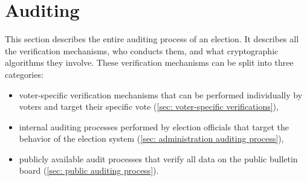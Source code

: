 \section{Auditing} \label{sec: auditing}
This section describes the entire auditing process of an election. It describes all the verification mechanisms, who conducts them, and what cryptographic algorithms they involve. These verification mechanisms can be split into three categories:
\begin{itemize}
    \item voter-specific verification mechanisms that can be performed individually by voters and target their specific vote (\cref{sec: voter-specific verifications}),
    \item internal auditing processes performed by election officials that target the behavior of the election system (\cref{sec: administration auditing process}),
    \item publicly available audit processes that verify all data on the public bulletin board (\cref{sec: public auditing process}).
\end{itemize}

